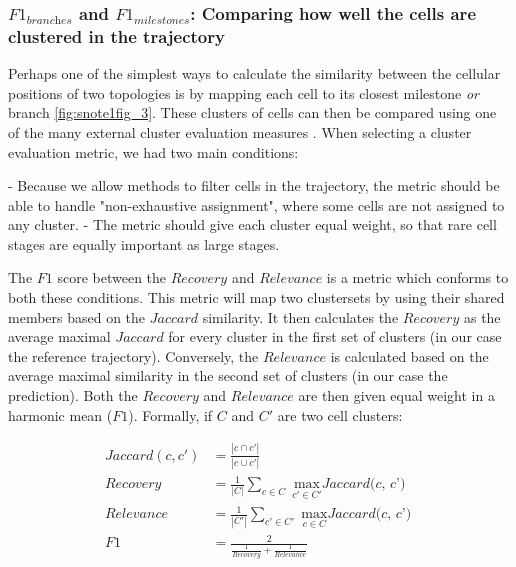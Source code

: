 \subsubsection{$\textit{F1}_{\textit{branches}}$ and $\textit{F1}_{\textit{milestones}}$: Comparing how well the cells are clustered in the trajectory}

Perhaps one of the simplest ways to calculate the similarity between the cellular positions of two topologies is by mapping each cell to its closest milestone \textit{or} branch \ref{fig:snote1fig_3}. These clusters of cells can then be compared using one of the many external cluster evaluation measures \cite{saelens_comprehensiveevaluationmodule_2018}. When selecting a cluster evaluation metric, we had two main conditions:

- Because we allow methods to filter cells in the trajectory, the metric should be able to handle "non-exhaustive assignment", where some cells are not assigned to any cluster.
- The metric should give each cluster equal weight, so that rare cell stages are equally important as large stages.

The $\textit{F1}$ score between the $\textit{Recovery}$ and $\textit{Relevance}$ is a metric which conforms to both these conditions. This metric will map two clustersets by using their shared members based on the $\textit{Jaccard}$ similarity. It then calculates the $\textit{Recovery}$ as the average maximal $\textit{Jaccard}$ for every cluster in the first set of clusters (in our case the reference trajectory). Conversely, the $\textit{Relevance}$ is calculated based on the average maximal similarity in the second set of clusters (in our case the prediction). Both the $\textit{Recovery}$ and $\textit{Relevance}$ are then given equal weight in a harmonic mean ($\textit{F1}$). Formally, if $C$ and $C'$ are two cell clusters:

\begin{align*}
\textit{Jaccard}(c, c') &= \frac{|c \cap c'|}{|c \cup c'|} \\
\textit{Recovery} &= \frac{1}{|C|} \sum_{c \in C}{\max_{c' \in C'}{\textit{Jaccard(c, c')}}} \\
\textit{Relevance} &= \frac{1}{|C'|} \sum_{c' \in C'}{\max_{c \in C}{\textit{Jaccard(c, c')}}} \\
\textit{F1} &= \frac{2}{\frac{1}{\textit{Recovery}} + \frac{1}{\textit{Relevance}}}
\end{align*}

